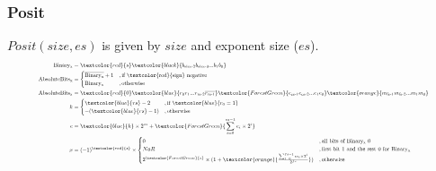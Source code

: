 

\begin{frame}
    \frametitle{Posit}
    $Posit(size, es)$ is given by $size$ and exponent size ($es$).
    \begin{equation}
        \resizebox{0.9\textwidth}{!}{%
        $
        \begin{aligned}
            \text{Binary}\textsubscript{x}&=\textcolor{red}{s}\textcolor{black}{b\textsubscript{size-2}b\textsubscript{size-3}...b\textsubscript{1}b\textsubscript{0}}\\
            \text{AbsoluteBits}\textsubscript{x}&=\begin{cases}
                \overline{\text{Binary}\textsubscript{x}} + 1 &, \text{if \textcolor{red}{sign} negative}\\
                 \text{Binary}\textsubscript{x} &, \text{otherwise}
            \end{cases}\\
            \text{AbsoluteBits}\textsubscript{x}&=\textcolor{red}{0}\textcolor{blue}{r\textsubscript{0}r\textsubscript{1}...r\textsubscript{rs-2}\overline{r\textsubscript{rs-1}}}\textcolor{ForestGreen}{e\textsubscript{es-1}e\textsubscript{es-2}...e\textsubscript{1}e\textsubscript{0}}\textcolor{orange}{m\textsubscript{fs-1}m\textsubscript{fs-2}...m\textsubscript{1}m\textsubscript{0}}\\
            k&=\begin{cases}
                \textcolor{blue}{rs}-2 &, \text{if } \textcolor{blue}{r_0=1}\\
                -(\textcolor{blue}{rs}-1) &, \text{otherwise}
            \end{cases}\\
            e&=\textcolor{blue}{k} \times 2^{es} + \textcolor{ForestGreen}{\sum_{i=0}^{es-1} e_i \times 2^{i}}\\
            x&=(-1)^{\textcolor{red}{s}} \times \begin{cases}
                    0 &, \text{all bits of \text{Binary}\textsubscript{x} $0$}\\
                    NaR &, \text{first bit $1$ and the rest $0$ for \text{Binary}\textsubscript{x}}\\
                    2^{\textcolor{ForestGreen}{e}} \times (1 + \textcolor{orange}{\frac{\sum_{i=0}^{fs-1} m_i \times 2^i}{2^{fs}}}) &, \text{otherwise}
            \end{cases}
        \end{aligned}$%
        }
    \end{equation}
\end{frame}



